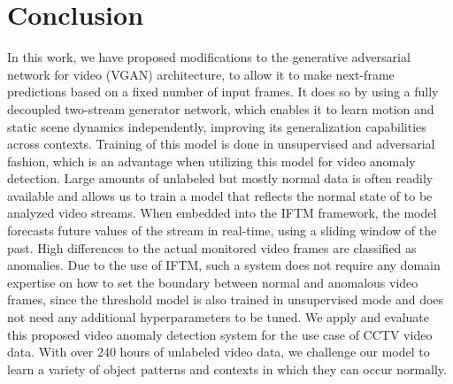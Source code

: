 \chapter{Conclusion} \label{chap:conclusion} %

In this work, we have proposed modifications to the generative adversarial network for video (VGAN) architecture, to allow it to make next-frame predictions based on a fixed number of input frames. It does so by using a fully decoupled two-stream generator network, which enables it to learn motion and static scene dynamics independently, improving its generalization capabilities across contexts. Training of this model is done in unsupervised and adversarial fashion, which is an advantage when utilizing this model for video anomaly detection. Large amounts of unlabeled but mostly normal data is often readily available and allows us to train a model that reflects the normal state of to be analyzed video streams. When embedded into the IFTM framework, the model forecasts future values of the stream in real-time, using a sliding window of the past. High differences to the actual monitored video frames are classified as anomalies. Due to the use of IFTM, such a system does not require any domain expertise on how to set the boundary between normal and anomalous video frames, since the threshold model is also trained in unsupervised mode and does not need any additional hyperparameters to be tuned. We apply and evaluate this proposed video anomaly detection system for the use case of CCTV video data. With over 240 hours of unlabeled video data, we challenge our model to learn a variety of object patterns and contexts in which they can occur normally. 

